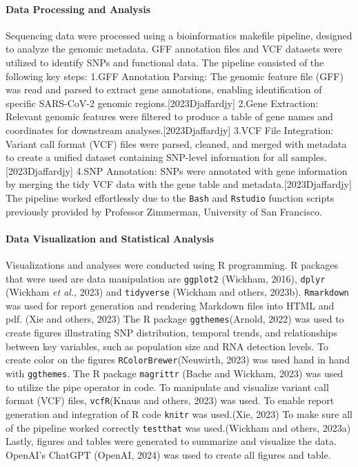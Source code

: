 \documentclass[
]{article}
\begin{document}
\hypertarget{data-processing-and-analysis}{%
\paragraph{Data Processing and
Analysis}\label{data-processing-and-analysis}}

Sequencing data were processed using a bioinformatics makefile pipeline,
designed to analyze the genomic metadata. GFF annotation files and VCF
datasets were utilized to identify SNPs and functional data. The
pipeline consisted of the following key steps: 1.GFF Annotation Parsing:
The genomic feature file (GFF) was read and parsed to extract gene
annotations, enabling identification of specific SARS-CoV-2 genomic
regions.{[}2023Djaffardjy{]} 2.Gene Extraction: Relevant genomic
features were filtered to produce a table of gene names and coordinates
for downstream analyses.{[}2023Djaffardjy{]} 3.VCF File Integration:
Variant call format (VCF) files were parsed, cleaned, and merged with
metadata to create a unified dataset containing SNP-level information
for all samples.{[}2023Djaffardjy{]} 4.SNP Annotation: SNPs were
annotated with gene information by merging the tidy VCF data with the
gene table and metadata.{[}2023Djaffardjy{]} The pipeline worked
effortlessly due to the \texttt{Bash} and \texttt{Rstudio} function
scripts previously provided by Professor Zimmerman, University of San
Francisco.

\hypertarget{data-visualization-and-statistical-analysis}{%
\paragraph{Data Visualization and Statistical
Analysis}\label{data-visualization-and-statistical-analysis}}

Visualizations and analyses were conducted using R programming. R
packages that were used are data manipulation are \texttt{ggplot2}
(Wickham, 2016), \texttt{dplyr} (Wickham \emph{et al.}, 2023) and
\texttt{tidyverse} (Wickham and others, 2023b). \texttt{Rmarkdown} was
used for report generation and rendering Markdown files into HTML and
pdf. (Xie and others, 2023) The R package \texttt{ggthemes}(Arnold,
2022) was used to create figures illustrating SNP distribution, temporal
trends, and relationships between key variables, such as population size
and RNA detection levels. To create color on the figures
\texttt{RColorBrewer}(Neuwirth, 2023) was used hand in hand with
\texttt{ggthemes}. The R package \texttt{magrittr} (Bache and Wickham,
2023) was used to utilize the pipe operator in code. To manipulate and
visualize variant call format (VCF) files, \texttt{vcfR}(Knaus and
others, 2023) was used. To enable report generation and integration of R
code \texttt{knitr} was used.(Xie, 2023) To make sure all of the
pipeline worked correctly \texttt{testthat} was used.(Wickham and
others, 2023a) Lastly, figures and tables were generated to summarize
and visualize the data. OpenAI's ChatGPT (OpenAI, 2024) was used to
create all figures and table.
\end{document}
